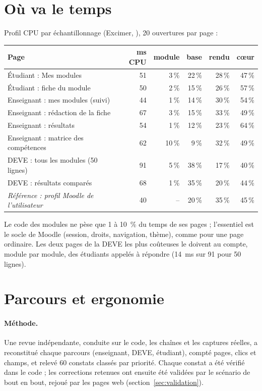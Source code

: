 \documentclass[11pt,a4paper]{article}
\newcommand{\code}[1]{\texttt{\detokenize{#1}}}
\begin{document}
\section{Où va le temps}

Profil CPU par échantillonnage (Excimer, \code{syllabus_profil.py}), 20 ouvertures par page :

\begin{center}
\small
\begin{tabularx}{\linewidth}{@{}X r r r r r@{}}
\toprule
\textbf{Page} & \textbf{ms CPU} & \textbf{module} & \textbf{base} & \textbf{rendu} & \textbf{c\oe ur} \\
\midrule
Étudiant : Mes modules & 51 & 3\,\% & 22\,\% & 28\,\% & 47\,\% \\
Étudiant : fiche du module & 50 & 2\,\% & 15\,\% & 26\,\% & 57\,\% \\
Enseignant : mes modules (suivi) & 44 & 1\,\% & 14\,\% & 30\,\% & 54\,\% \\
Enseignant : rédaction de la fiche & 67 & 3\,\% & 15\,\% & 33\,\% & 49\,\% \\
Enseignant : résultats & 54 & 1\,\% & 12\,\% & 23\,\% & 64\,\% \\
Enseignant : matrice des compétences & 62 & 10\,\% & 9\,\% & 32\,\% & 49\,\% \\
DEVE : tous les modules (50 lignes) & 91 & 5\,\% & 38\,\% & 17\,\% & 40\,\% \\
DEVE : résultats comparés & 68 & 1\,\% & 35\,\% & 20\,\% & 44\,\% \\
\textit{Référence : profil Moodle de l'utilisateur} & 40 & -- & 20\,\% & 35\,\% & 45\,\% \\
\bottomrule
\end{tabularx}
\end{center}

Le code des modules ne pèse que 1 à 10~\% du temps de ses pages ; l'essentiel est le socle de
Moodle (session, droits, navigation, thème), comme pour une page ordinaire. Les deux pages de la
DEVE les plus coûteuses le doivent au compte, module par module, des étudiants appelés à
répondre (14~ms sur 91 pour 50 lignes).

\section{Parcours et ergonomie}\label{sec:parcours}

\paragraph{Méthode.} Une revue indépendante, conduite sur le code, les chaînes et les captures
réelles, a reconstitué chaque parcours (enseignant, DEVE, étudiant), compté pages, clics et
champs, et relevé 60 constats classés par priorité. Chaque constat a été vérifié dans le code ;
les corrections retenues ont ensuite été validées par le scénario de bout en bout, rejoué par
les pages web (section~\ref{sec:validation}).
\end{document}
